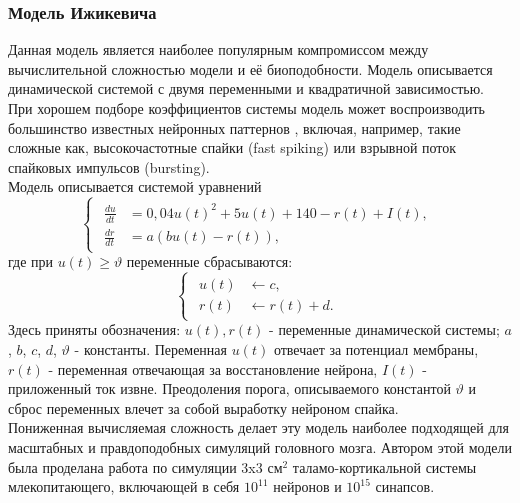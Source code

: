 \documentclass[a4paper,10pt]{article}
\begin{document}
\subsubsection{Модель Ижикевича}
\indent Данная модель является наиболее популярным компромиссом между вычислительной сложностью модели и её биоподобности. Модель описывается динамической системой с двумя переменными и квадратичной зависимостью. При хорошем подборе коэффициентов системы модель может воспроизводить большинство известных нейронных паттернов \cite{IzhSimpleModel}, включая, например, такие сложные как, высокочастотные спайки (fast spiking) или взрывной поток спайковых импульсов (bursting).\\
\indent Модель описывается системой уравнений
\begin{equation*}\label{eq:izh}
\left\{  \begin{array}{c} \begin{aligned}
	\frac{du}{dt} &= 0,04u(t)^2+5u(t)+140-r(t) + I(t), \nonumber \\
	\frac{dr}{dt} &= a(bu(t)-r(t)), \nonumber 
	\end{aligned}	
	\end{array} \right.
\end{equation*}
где при $u(t) \geq \vartheta$ переменные сбрасываются:
\begin{equation*}\label{eq:izh_reset}
\left\{  \begin{array}{c} \begin{aligned}
	u(t) &\leftarrow c \nonumber, \\
	r(t) &\leftarrow r(t)+d.
	\end{aligned}	
	\end{array} \right.
\end{equation*}
Здесь приняты обозначения: $u(t), r(t)$ - переменные динамической системы; $a$, $b$, $c$, $d$, $\vartheta$ - константы. Переменная $u(t)$ отвечает за потенциал мембраны, $r(t)$ - переменная отвечающая за восстановление нейрона, $I(t)$ - приложенный ток извне. Преодоления порога, описываемого константой $\vartheta$ и сброс переменных влечет за собой выработку нейроном спайка.\\
\indent Пониженная вычисляемая сложность делает эту модель наиболее подходящей для масштабных и правдоподобных симуляций головного мозга. Автором этой модели была проделана работа \cite{IzhTalam} по симуляции 3x3 см$^2$ таламо-кортикальной системы млекопитающего, включающей в себя $10^{11}$ нейронов и $10^{15}$ синапсов.
\end{document}
